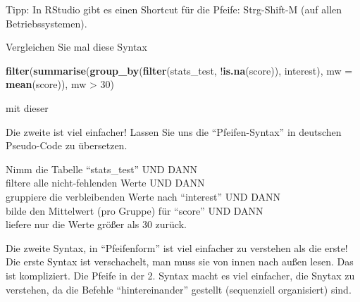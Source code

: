 \documentclass[12pt,ngerman,]{book}
\makeatletter
\newenvironment{Shaded}{\begin{snugshade}}{\end{snugshade}}
\newcommand{\KeywordTok}[1]{\textcolor[rgb]{0.13,0.29,0.53}{\textbf{{#1}}}}
\newcommand{\DataTypeTok}[1]{\textcolor[rgb]{0.13,0.29,0.53}{{#1}}}
\newcommand{\DecValTok}[1]{\textcolor[rgb]{0.00,0.00,0.81}{{#1}}}
\newcommand{\StringTok}[1]{\textcolor[rgb]{0.31,0.60,0.02}{{#1}}}
\newcommand{\CommentTok}[1]{\textcolor[rgb]{0.56,0.35,0.01}{\textit{{#1}}}}
\newcommand{\NormalTok}[1]{{#1}}
\newenvironment{kframe}{%
\medskip{}
\setlength{\fboxsep}{.8em}
 \def\at@end@of@kframe{}%
 \ifinner\ifhmode%
  \def\at@end@of@kframe{\end{minipage}}%
  \begin{minipage}{\columnwidth}%
 \fi\fi%
 \def\FrameCommand##1{\hskip\@totalleftmargin \hskip-\fboxsep
 \colorbox{shadecolor}{##1}\hskip-\fboxsep
     \hskip-\linewidth \hskip-\@totalleftmargin \hskip\columnwidth}%
 \MakeFramed {\advance\hsize-\width
   \@totalleftmargin\z@ \linewidth\hsize
   \@setminipage}}%
 {\par\unskip\endMakeFramed%
 \at@end@of@kframe}
\renewenvironment{Shaded}{\begin{kframe}}{\end{kframe}}
\theoremstyle{definition}
\theoremstyle{definition}
\theoremstyle{remark}
\let\BeginKnitrBlock\begin \let\EndKnitrBlock\end
\makeatother
\begin{document}
\BeginKnitrBlock{rmdcaution}
Tipp: In RStudio gibt es einen Shortcut für die Pfeife: Strg-Shift-M
(auf allen Betriebssystemen).
\EndKnitrBlock{rmdcaution}

Vergleichen Sie mal diese Syntax

\begin{Shaded}
\begin{Highlighting}[]
\KeywordTok{filter}\NormalTok{(}\KeywordTok{summarise}\NormalTok{(}\KeywordTok{group_by}\NormalTok{(}\KeywordTok{filter}\NormalTok{(stats_test, }
       \NormalTok{!}\KeywordTok{is.na}\NormalTok{(score)), interest), }\DataTypeTok{mw =} \KeywordTok{mean}\NormalTok{(score)), mw >}\StringTok{ }\DecValTok{30}\NormalTok{)}
\end{Highlighting}
\end{Shaded}

mit dieser

\begin{Shaded}
\end{Shaded}

Die zweite ist viel einfacher! Lassen Sie uns die ``Pfeifen-Syntax'' in
deutschen Pseudo-Code zu übersetzen.

\BeginKnitrBlock{rmdpseudocode}
Nimm die Tabelle ``stats\_test'' UND DANN\\
filtere alle nicht-fehlenden Werte UND DANN\\
gruppiere die verbleibenden Werte nach ``interest'' UND DANN\\
bilde den Mittelwert (pro Gruppe) für ``score'' UND DANN\\
liefere nur die Werte größer als 30 zurück.
\EndKnitrBlock{rmdpseudocode}

Die zweite Syntax, in ``Pfeifenform'' ist viel einfacher zu verstehen
als die erste! Die erste Syntax ist verschachelt, man muss sie von innen
nach außen lesen. Das ist kompliziert. Die Pfeife in der 2. Syntax macht
es viel einfacher, die Snytax zu verstehen, da die Befehle
``hintereinander'' gestellt (sequenziell organisiert) sind.
\end{document}
